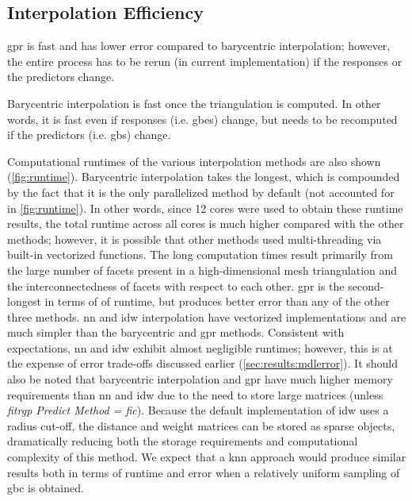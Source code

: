\documentclass[preprint,12pt]{elsarticle}
\begin{document}
\subsection{Interpolation Efficiency}
\label{sec:results:efficiency}

\Gls{gpr} is fast and has lower error compared to barycentric interpolation; however, the entire process has to be rerun (in current implementation) if the responses or the predictors change.

Barycentric interpolation is fast once the triangulation is computed. In other words, it is fast even if responses (i.e. \glspl{gbe}) change, but needs to be recomputed if the predictors (i.e. \glspl{gb}) change.

Computational runtimes of the various interpolation methods are also shown (\cref{fig:runtime}). Barycentric interpolation takes the longest, which is compounded by the fact that it is the only parallelized method by default (not accounted for in \cref{fig:runtime}). In other words, since 12 cores were used to obtain these runtime results, the total runtime across all cores is much higher compared with the other methods; however, it is possible that other methods used multi-threading via built-in vectorized functions. The long computation times result primarily from the large number of facets present in a high-dimensional mesh triangulation and the interconnectedness of facets with respect to each other. \Gls{gpr} is the second-longest in terms of of runtime, but produces better error than any of the other three methods. \Gls{nn} and \gls{idw} interpolation have vectorized implementations and are much simpler than the barycentric and \gls{gpr} methods. Consistent with expectations, \gls{nn} and \gls{idw} exhibit almost negligible runtimes; however, this is at the expense of error trade-offs discussed earlier (\cref{sec:results:mdlerror}). It should also be noted that barycentric interpolation and \gls{gpr} have much higher memory requirements than \gls{nn} and \gls{idw} due to the need to store large matrices (unless \textit{fitrgp Predict Method = \gls{fic}}). Because the default implementation of \gls{idw} uses a radius cut-off, the distance and weight matrices can be stored as sparse objects, dramatically reducing both the storage requirements and computational complexity of this method. We expect that a \gls{knn} approach would produce similar results both in terms of runtime and error when a relatively uniform sampling of \gls{gbc} is obtained.
\end{document}
